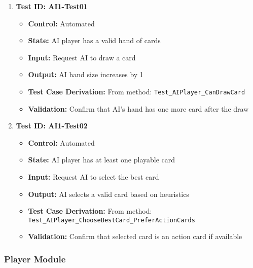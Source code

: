 \documentclass[12pt]{article}
\begin{document}
\begin{enumerate}
    \item \textbf{Test ID: AI1-Test01}
    \begin{itemize}
        \item \textbf{Control:} Automated
        \item \textbf{State:} AI player has a valid hand of cards
        \item \textbf{Input:} Request AI to draw a card
        \item \textbf{Output:} AI hand size increases by 1
        \item \textbf{Test Case Derivation:} From method: \texttt{Test\_AIPlayer\_CanDrawCard}
        \item \textbf{Validation:} Confirm that AI's hand has one more card after the draw
    \end{itemize}

    \item \textbf{Test ID: AI1-Test02}
    \begin{itemize}
        \item \textbf{Control:} Automated
        \item \textbf{State:} AI player has at least one playable card
        \item \textbf{Input:} Request AI to select the best card
        \item \textbf{Output:} AI selects a valid card based on heuristics
        \item \textbf{Test Case Derivation:} From method: \texttt{Test\_AIPlayer\_ChooseBestCard\_PreferActionCards}
        \item \textbf{Validation:} Confirm that selected card is an action card if available
    \end{itemize}
\end{enumerate}

\subsubsection{Player Module}
\end{document}
